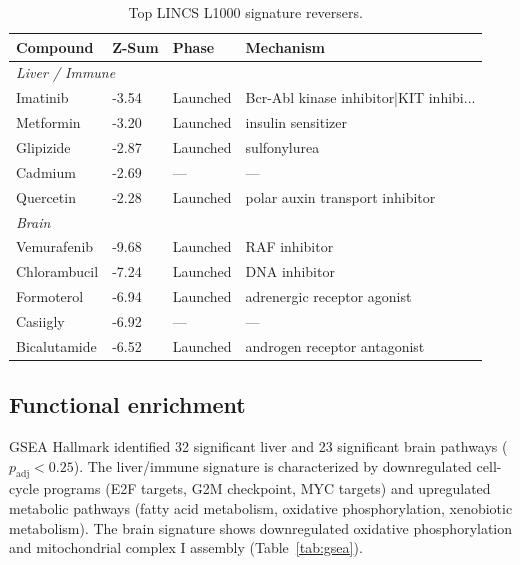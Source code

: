\documentclass[11pt,a4paper]{article}
\begin{document}
\begin{table}[ht]
\centering
\caption{Top LINCS L1000 signature reversers.}
\label{tab:reversers}
\small
\begin{tabular}{llll}
\toprule
\textbf{Compound} & \textbf{Z-Sum} & \textbf{Phase} & \textbf{Mechanism} \\
\midrule
\multicolumn{4}{l}{\textit{Liver / Immune}} \\
Imatinib & -3.54 & Launched & Bcr-Abl kinase inhibitor|KIT inhibi... \\
Metformin & -3.20 & Launched & insulin sensitizer \\
Glipizide & -2.87 & Launched & sulfonylurea \\
Cadmium & -2.69 & --- & --- \\
Quercetin & -2.28 & Launched & polar auxin transport inhibitor \\
\midrule
\multicolumn{4}{l}{\textit{Brain}} \\
Vemurafenib & -9.68 & Launched & RAF inhibitor \\
Chlorambucil & -7.24 & Launched & DNA inhibitor \\
Formoterol & -6.94 & Launched & adrenergic receptor agonist \\
Casiigly & -6.92 & --- & --- \\
Bicalutamide & -6.52 & Launched & androgen receptor antagonist \\
\bottomrule
\end{tabular}
\end{table}

\subsection{Functional enrichment}
GSEA Hallmark identified 32 significant liver and 23 significant brain pathways ($p_{\text{adj}} < 0.25$). 
The liver/immune signature is characterized by downregulated cell-cycle programs (E2F targets, G2M 
checkpoint, MYC targets) and upregulated metabolic pathways (fatty acid metabolism, oxidative 
phosphorylation, xenobiotic metabolism). The brain signature shows downregulated oxidative 
phosphorylation and mitochondrial complex I assembly (Table~\ref{tab:gsea}).
\end{document}
